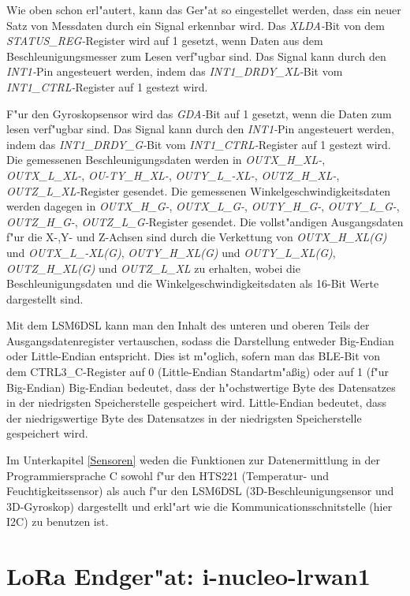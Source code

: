 Wie oben schon erl"autert, kann das Ger"at so eingestellet werden, dass 
ein neuer Satz von Messdaten durch ein Signal erkennbar wird. Das 
\textit{XLDA-}Bit von dem \textit{STATUS\_REG-}Register wird auf 1 
gesetzt, wenn Daten aus dem Beschleunigungsmesser zum Lesen verf"ugbar 
sind. Das Signal kann durch den \textit{INT1-}Pin angesteuert werden, 
indem  das \textit{INT1\_DRDY\_XL-}Bit vom \textit{INT1\_CTRL-}Register 
auf 1 gestezt wird. 

F"ur den Gyroskopsensor wird das \textit{GDA-}Bit auf 1 gesetzt, wenn 
die Daten zum lesen verf"ugbar sind. Das Signal kann durch den 
\textit{INT1-}Pin angesteuert werden, indem  das 
\textit{INT1\_DRDY\_G-}Bit vom \textit{INT1\_CTRL-}Register auf 1 
gestezt wird. Die gemessenen Beschleunigungsdaten werden in 
\textit{OUTX\_H\_XL-}, \textit{OUTX\_L\_XL-}, \textit{OU-TY\_H\_XL-}, 
\textit{OUTY\_L\_-XL-}, \textit{OUTZ\_H\_XL-}, 
\textit{OUTZ\_L\_XL-}Register gesendet. Die gemessenen 
Winkelgeschwindigkeitsdaten werden dagegen in \textit{OUTX\_H\_G-}, 
\textit{OUTX\_L\_G-}, \textit{OUTY\_H\_G-}, \textit{OUTY\_L\_G-}, 
\textit{OUTZ\_H\_G-}, \textit{OUTZ\_L\_G-}Register gesendet. Die 
vollst"andigen Ausgangsdaten f"ur die X-,Y- und Z-Achsen sind durch die 
Verkettung von \textit{OUTX\_H\_XL(G)} und \textit{OUTX\_L\_-XL(G)}, 
\textit{OUTY\_H\_XL(G)} und \textit{OUTY\_L\_XL(G)}, 
\textit{OUTZ\_H\_XL(G)} und \textit{OUTZ\_L\_XL} zu erhalten, wobei die 
Beschleunigungsdaten und die Winkelgeschwindigkeitsdaten als 16-Bit 
Werte dargestellt sind.

Mit dem LSM6DSL kann man den Inhalt des unteren und oberen Teils der 
Ausgangsdatenregister vertauschen, sodass die Darstellung entweder 
Big-Endian oder Little-Endian entspricht. Dies ist m"oglich, sofern man 
das BLE-Bit von dem CTRL3\_C-Register auf 0 (Little-Endian 
Standartm"a\ss{}ig) oder auf 1 (f"ur Big-Endian) 
Big-Endian bedeutet, dass der h"ochstwertige Byte des Datensatzes in 
der niedrigsten Speicherstelle gespeichert wird.
Little-Endian bedeutet, dass der niedrigswertige Byte des Datensatzes 
in der niedrigsten Speicherstelle gespeichert wird.


Im Unterkapitel \ref{Sensoren} weden die Funktionen zur Datenermittlung 
in der Programmiersprache C sowohl f"ur den HTS221 (Temperatur- und 
Feuchtigkeitssensor) als auch f"ur den LSM6DSL (3D-Beschleunigungsensor 
und 3D-Gyroskop) dargestellt und erkl"art wie die 
Kommunicationsschnitstelle (hier I2C) zu benutzen ist.


\section{LoRa Endger"at: i-nucleo-lrwan1}\label{LoRa Modul}

